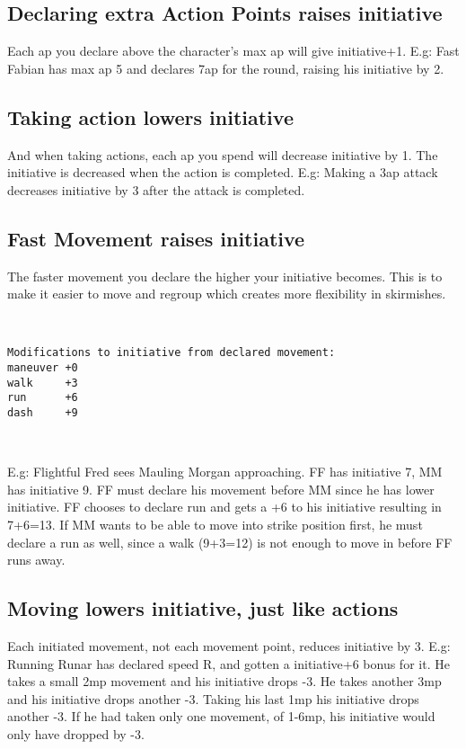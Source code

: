 \subsection*{Declaring extra Action Points raises initiative}
Each ap you declare above the character's max ap will give initiative+1. 
E.g: Fast Fabian has max ap 5 and declares 7ap for the round, raising his initiative by 2.


\subsection*{Taking action lowers initiative}
And when taking actions, each ap you spend will decrease initiative by 1. The initiative is decreased when the action is completed.
E.g: Making a 3ap attack decreases initiative by 3 after the attack is completed.


\subsection*{Fast Movement raises initiative}
The faster movement you declare the higher your initiative becomes. This is to make it easier to move and regroup which creates more flexibility in skirmishes.

\

\begin{verbatim}
Modifications to initiative from declared movement:
maneuver +0
walk     +3
run      +6
dash     +9
\end{verbatim}

\

E.g: Flightful Fred sees Mauling Morgan approaching. FF has initiative 7, MM has initiative 9. FF must declare his movement before MM since he has lower initiative. FF chooses to declare run and gets a +6 to his initiative resulting in 7+6=13. If MM wants to be able to move into strike position first, he must declare a run as well, since a walk (9+3=12) is not enough to move in before FF runs away.


\subsection*{Moving lowers initiative, just like actions}
\label{sec:movinglowersinitiative}
Each initiated movement, not each movement point, reduces initiative by 3. E.g: Running Runar has declared speed R, and gotten a initiative+6 bonus for it. He takes a small 2mp movement and his initiative drops -3. He takes another 3mp and his initiative drops another -3. Taking his last 1mp his initiative drops another -3. If he had taken only one movement, of 1-6mp, his initiative would only have dropped by -3.


